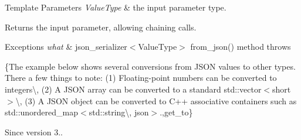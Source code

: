 \begin{DoxyTemplParams}{Template Parameters}
{\em Value\+Type} & the input parameter type.\\
\hline
\end{DoxyTemplParams}
\begin{DoxyReturn}{Returns}
the input parameter, allowing chaining calls.
\end{DoxyReturn}

\begin{DoxyExceptions}{Exceptions}
{\em what} & json\+\_\+serializer$<$\+Value\+Type$>$ {\ttfamily from\+\_\+json()} method throws\\
\hline
\end{DoxyExceptions}
\{The example below shows several conversions from J\+S\+ON values to other types. There a few things to note\+: (1) Floating-\/point numbers can be converted to integers\textbackslash{}, (2) A J\+S\+ON array can be converted to a standard {\ttfamily std\+::vector$<$short$>$}\textbackslash{}, (3) A J\+S\+ON object can be converted to C++ associative containers such as {\ttfamily std\+::unordered\+\_\+map$<$std\+::string\textbackslash{}, json$>$}.,get\+\_\+to\}

\begin{DoxySince}{Since}
version 3.. 
\end{DoxySince}
\mbox{\label{classnlohmann_1_1basic__json_a0136728f5db69d4051c77b94307abd6c}} 
